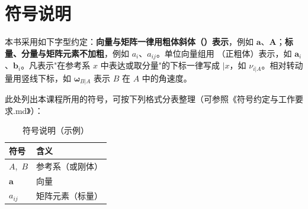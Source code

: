 \section{符号说明}
\label{sec:符号说明}

本书采用如下字型约定：\textbf{向量与矩阵一律用粗体斜体（$\boldsymbol{}$）表示}，例如 $\boldsymbol{a}$、$\boldsymbol{A}$；\textbf{标量、分量与矩阵元素不加粗}，例如 $a_i$、$a_{ij}$。单位向量组用 $\mathbf{}$（正粗体）表示，如 $\mathbf{a}_i$、$\mathbf{b}_i$。凡表示"在参考系 $x$ 中表达或取分量"的下标一律写成 $|x$，如 $\nu_{i|A}$。相对转动量用竖线下标，如 $\boldsymbol{\omega}_{B|A}$ 表示 $B$ 在 $A$ 中的角速度。

此处列出本课程所用的符号，可按下列格式分表整理（可参照《符号约定与工作要求.md》）：

\begin{table}[H]
\centering
\caption{符号说明（示例）}
\label{tab:符号说明}
\begin{tabular}{ll}
\toprule
符号 & 含义 \\
\midrule
$A$,\, $B$ & 参考系（或刚体） \\
$\boldsymbol{a}$ & 向量 \\
$a_{ij}$ & 矩阵元素（标量） \\
\bottomrule
\end{tabular}
\end{table}
